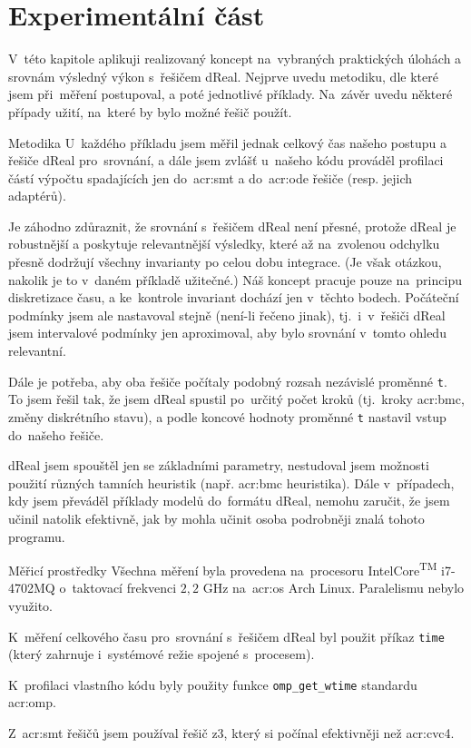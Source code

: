 \documentclass[thesis=M,czech]{FITthesis}[2012/06/26]
\newcommand{\acrlabel}[1]{acr:#1}
\newcommand{\acr}[1]{\acrshort{\acrlabel{#1}}}
\newcommand{\id}[1]{\texttt{#1}}
\newcommand{\reg}{\textsuperscript{\textregistered}}
\begin{document}
\chapter{Experimentální část}\label{ch:exp}
V~této kapitole aplikuji realizovaný koncept
na~vybraných praktických úlohách
a srovnám výsledný výkon s~řešičem dReal.
Nejprve uvedu metodiku,
dle které jsem při~měření postupoval,
a poté jednotlivé příklady.
Na~závěr uvedu některé případy užití,
na~které by bylo možné řešič použít.


\begin{section}{Metodika}\label{s:exp:method}
U~každého příkladu jsem měřil jednak celkový čas
našeho postupu a řešiče dReal pro~srovnání,
a dále jsem zvlášť u~našeho kódu prováděl
profilaci částí výpočtu spadajících
jen do~\acr{smt} a do~\acr{ode} řešiče
(resp. jejich adaptérů).

Je záhodno zdůraznit, že srovnání
s~řešičem dReal není přesné,
protože dReal je robustnější a poskytuje
relevantnější výsledky, které až na~zvolenou odchylku
přesně dodržují všechny invarianty po celou dobu integrace.
(Je však otázkou, nakolik je to v~daném příkladě užitečné.)
Náš koncept pracuje pouze na~principu diskretizace času,
a ke~kontrole invariant dochází jen v~těchto bodech.
Počáteční podmínky jsem ale nastavoval stejně (není-li řečeno jinak),
tj.~i~v~řešiči dReal jsem intervalové podmínky jen aproximoval,
aby bylo srovnání v~tomto ohledu relevantní.

Dále je potřeba, aby oba řešiče počítaly
podobný rozsah nezávislé proměnné \id{t}.
To jsem řešil tak, že jsem dReal spustil
po~určitý počet kroků (tj.~kroky \acr{bmc}, změny diskrétního stavu),
a podle koncové hodnoty proměnné \id{t}
nastavil vstup do~našeho řešiče.

dReal jsem spouštěl jen se základními parametry,
nestudoval jsem možnosti použití různých tamních heuristik
(např. \acr{bmc} heuristika).
Dále v~případech, kdy jsem převáděl příklady modelů
do~formátu dReal, nemohu zaručit,
že jsem učinil natolik efektivně,
jak by mohla učinit osoba
podrobněji znalá tohoto programu.


\begin{subsection}{Měřicí prostředky}\label{ss:exp:method:resources}
Všechna měření byla provedena
na~procesoru
Intel\reg Core\textsuperscript{TM}
i7-4702MQ o~taktovací frekvenci $2{,}2$ GHz
na~\acr{os} Arch Linux.
Paralelismu nebylo využito.

K~měření celkového času pro~srovnání s~řešičem dReal
byl použit příkaz \id{time}
(který zahrnuje i~systémové režie spojené s~procesem).

K~profilaci vlastního kódu byly použity
funkce \id{omp\_\-get\_\-wtime}
standardu \acr{omp}.

Z~\acr{smt} řešičů jsem používal řešič z3,
který si počínal efektivněji než \acr{cvc}4.
\end{subsection} %


\end{section} %
\end{document}
